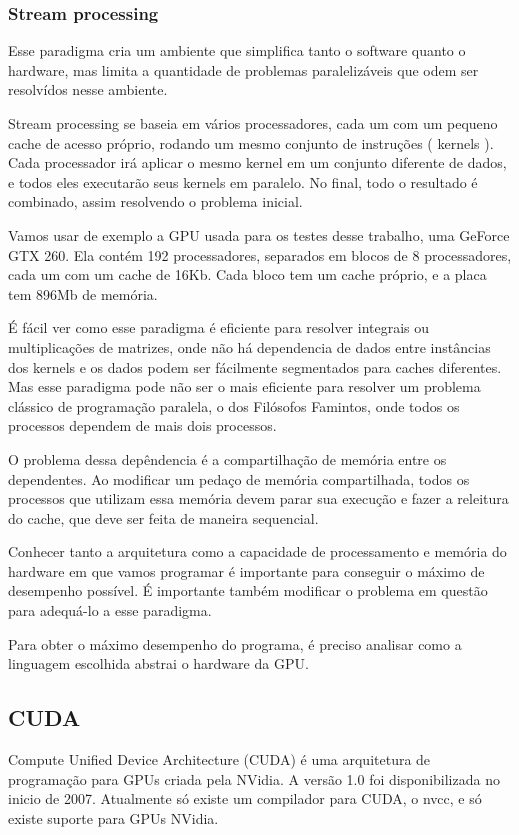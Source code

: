 \subsubsection{Stream processing}
Esse paradigma cria um ambiente que simplifica tanto o software quanto o hardware, mas limita a quantidade de problemas 
paralelizáveis que odem ser resolvídos nesse ambiente.

Stream processing se baseia em vários processadores, cada um com um pequeno cache de acesso próprio, 
rodando um mesmo conjunto de instruções ( kernels ). Cada processador irá aplicar o mesmo kernel em um
conjunto diferente de dados, e todos eles executarão seus kernels em paralelo. No final, todo o resultado é
combinado, assim resolvendo o problema inicial.

Vamos usar de exemplo a GPU usada para os testes desse trabalho, uma GeForce GTX 260. Ela contém
192 processadores, separados em blocos de 8 processadores, cada um com um cache de 16Kb. Cada bloco
tem um cache próprio, e a placa tem 896Mb de memória.

É fácil ver como esse paradigma é eficiente para resolver integrais ou multiplicações de matrizes, onde não há
dependencia de dados entre instâncias dos kernels e os dados podem ser fácilmente segmentados para caches diferentes.
Mas esse paradigma pode não ser o mais eficiente para resolver um problema clássico de programação paralela, o dos
Filósofos Famintos, onde todos os processos dependem de mais dois processos.

O problema dessa depêndencia é a compartilhação de memória entre os dependentes. Ao modificar um pedaço de memória
compartilhada, todos os processos que utilizam essa memória devem parar sua execução e fazer a releitura do cache,
que deve ser feita de maneira sequencial.

Conhecer tanto a arquitetura como a capacidade de processamento e memória do hardware em que vamos programar é 
importante para conseguir o máximo de desempenho possível. É importante também modificar o problema em questão 
para adequá-lo a esse paradigma.

Para obter o máximo desempenho do programa, é preciso analisar como a linguagem escolhida abstrai o hardware da GPU.


\subsection{CUDA}
Compute Unified Device Architecture (CUDA) é uma arquitetura de programação para GPUs criada pela NVidia.
A versão 1.0 foi disponibilizada no inicio de 2007. Atualmente só existe um compilador para CUDA, o nvcc,
e só existe suporte para GPUs NVidia.

